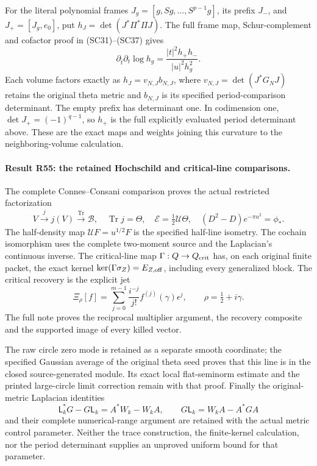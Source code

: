 For the literal polynomial frames
\(J_g=[g,Sg,\ldots,S^{p-1}g]\), its prefix \(J_-\), and
\(J_+=[J_g,e_0]\), put
\(h_J=\det(J^*\Pi^*\Pi J)\). The full frame map,
Schur-complement and cofactor proof in (SC31)--(SC37) gives
\[
 \partial_{\bar t}\partial_t\log h_g
       =\frac{|t|^2h_+h_-}{|u|^2h_g^2}.
\]
Each volume factors exactly as \(h_J=v_{N,J}b_{N,J}\), where
\(v_{N,J}=\det(J^*G_NJ)\) retains the original theta metric
and \(b_{N,J}\) is its specified period-comparison determinant.
The empty prefix has determinant one. In codimension one,
\(\det J_+=(-1)^{q-1}\), so \(h_+\) is the full explicitly
evaluated period determinant above. These are the exact maps and
weights joining this curvature to the neighboring-volume calculation.

\paragraph{Result R55: the retained Hochschild and critical-line comparisons.}
The complete Connes--Consani comparison proves the actual restricted
factorization
\[
 V\xrightarrow{j}j(V)\xrightarrow{\operatorname{Tr}}\mathscr B,
 \quad \operatorname{Tr}j=\Theta,
 \quad\mathcal E=\tfrac12\mathcal U\Theta,
 \quad (D^2-D)e^{-\pi u^2}=\phi_*.
\]
The half-density map \(\mathcal U F=u^{1/2}F\) is the specified
half-line isometry. The cochain isomorphism uses the complete
two-moment source and the Laplacian's continuous inverse. The
critical-line map \(\Gamma:Q\to Q_{\rm crit}\) has, on each
original finite packet, the exact kernel
\(\ker(\Gamma\sigma_Z)=E_{Z,\rm off}\), including every
generalized block. The critical recovery is the explicit jet
\[
 \Xi_\rho[f]=\sum_{j=0}^{m-1}
      \frac{i^{-j}}{j!}f^{(j)}(\gamma)\epsilon^j,
 \qquad \rho=\tfrac12+i\gamma.
\]
The full note proves the reciprocal multiplier argument, the
recovery composite and the supported image of every killed vector.

The raw circle zero mode is retained as a separate smooth coordinate;
the specified Gaussian average of the original theta seed proves
that this line is in the closed source-generated module. Its exact
local flat-seminorm estimate and the printed large-circle limit
correction remain with that proof. Finally the original-metric
Laplacian identities
\[
 \mathsf L_k^*G-G\mathsf L_k=A^*W_k-W_kA,
 \qquad G\mathsf L_k=W_kA-A^*GA
\]
and their complete numerical-range argument are retained with the
actual metric control parameter. Neither the trace construction,
the finite-kernel calculation, nor the period determinant supplies
an unproved uniform bound for that parameter.



